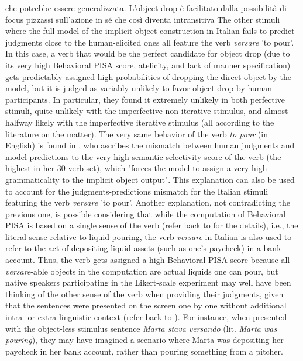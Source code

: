 che potrebbe essere generalizzata. L’object drop è facilitato dalla possibilità di focus pizzassi sull’azione in sé che così diventa intransitiva
The other stimuli where the full model of the implicit object construction in Italian fails to predict judgments close to the human-elicited ones all feature the verb \textit{versare} 'to pour'. In this case, a verb that would be the perfect candidate for object drop (due to its very high Behavioral PISA score, atelicity, and lack of manner specification) gets predictably assigned high probabilities of dropping the direct object by the model, but it is judged as variably unlikely to favor object drop by human participants. In particular, they found it extremely unlikely in both perfective stimuli, quite unlikely with the imperfective non-iterative stimulus, and almost halfway likely with the imperfective iterative stimulus (all according to the literature on the matter). The very same behavior of the verb \textit{to pour} (in English) is found in \textcite[148]{Medina2007}, who ascribes the mismatch between human judgments and model predictions to the very high semantic selectivity score of the verb (the highest in her 30-verb set), which "forces the model to assign a very high grammaticality to the implicit object output". This explanation can also be used to account for the judgments-predictions mismatch for the Italian stimuli featuring the verb \textit{versare} 'to pour'. Another explanation, not contradicting the previous one, is possible considering that while the computation of Behavioral PISA is based on a single sense of the verb (refer back to  for the details), i.e., the literal sense relative to liquid pouring, the verb \textit{versare} in Italian is also used to refer to the act of depositing liquid assets (such as one's paycheck) in a bank account. Thus, the verb gets assigned a high Behavioral PISA score because all \textit{versare}-able objects in the computation are actual liquids one can pour, but native speakers participating in the Likert-scale experiment may well have been thinking of the other sense of the verb when providing their judgments, given that the sentences were presented on the screen one by one without additional intra- or extra-linguistic context (refer back to ). For instance, when presented with the object-less stimulus sentence \textit{Marta stava versando} (lit. \textit{Marta was pouring}), they may have imagined a scenario where Marta was depositing her paycheck in her bank account, rather than pouring something from a pitcher.

